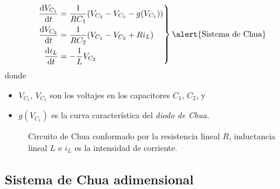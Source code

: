 \begin{frame}
	\begin{minipage}{0.55\textwidth}
		\begin{equation}\label{eq:chua}
			\left.
			\begin{aligned}
				\diff{V_{C_{1}}}{t} & =\frac{1}{RC_{1}}(V_{C_{2}} - V_{C_{1}} - g(V_{C_{1}})) \\
				\diff{V_{C_{2}}}{t} & =\frac{1}{RC_{2}}(V_{C_{1}} - V_{C_{2}} + Ri_{L})       \\
				\diff{i_{L}}{t}     & =-\frac{1}{L}V_{C_{2}}
			\end{aligned}
			\right\}
			\text{\alert{Sistema de Chua}}
		\end{equation}
		donde
		\begin{itemize}
			\item $V_{C_{1}}$, $V_{C_{2}}$ son los voltajes en los capacitores $C_{1}$, $C_{2}$, y
			\item $g\left(V_{C_{1}}\right)$ es la curva característica del \emph{diodo de Chua}.
		\end{itemize}
	\end{minipage}
	\begin{minipage}{0.35\textwidth}
		\begin{figure}[ht!]
			\centering
			
			\caption{Circuito de Chua conformado por la resistencia lineal $R$,
				inductancia lineal $L$ e $i_{L}$ es la intensidad de corriente.}\label{fig:chua_circuit}
		\end{figure}
	\end{minipage}

\end{frame}

\subsection{Sistema de Chua adimensional}

